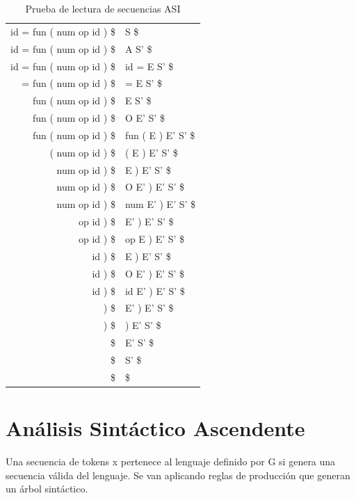 \documentclass[12pt, twoside, openright]{report} %
\begin{document}
\begin{enumerate}
\begin{table}[H]
    \centering
    \begin{tabular}{r|l}
    id = fun ( num op id ) \$ & S \$               \\
    id = fun ( num op id ) \$ & A S' \$            \\
    id = fun ( num op id ) \$ & id = E S' \$       \\
    = fun ( num op id ) \$    & = E S' \$          \\
    fun ( num op id ) \$      & E S' \$            \\
    fun ( num op id ) \$      & O E' S' \$         \\
    fun ( num op id ) \$      & fun ( E ) E' S' \$ \\
    ( num op id ) \$          & ( E ) E' S' \$     \\
    num op id ) \$            & E ) E' S' \$       \\
    num op id ) \$            & O E' ) E' S' \$    \\
    num op id ) \$            & num E' ) E' S' \$  \\
    op id ) \$                & E' ) E' S' \$      \\
    op id ) \$                & op E ) E' S' \$    \\
    id ) \$                   & E ) E' S' \$       \\
    id ) \$                   & O E' ) E' S' \$    \\
    id ) \$                   & id E' ) E' S' \$   \\
    ) \$                      & E' ) E' S' \$      \\
    ) \$                      & ) E' S' \$         \\
    \$                        & E' S' \$           \\
    \$                        & S' \$              \\
    \$                        & \$
    \end{tabular}
    \caption{Prueba de lectura de secuencias ASI}
  \end{table}
  
\end{enumerate}
\pagebreak
\section{Análisis Sintáctico Ascendente}

Una secuencia de tokens x pertenece al lenguaje definido por G si genera una secuencia válida del lenguaje. Se van aplicando reglas de producción que generan un árbol sintáctico.
\end{document}
